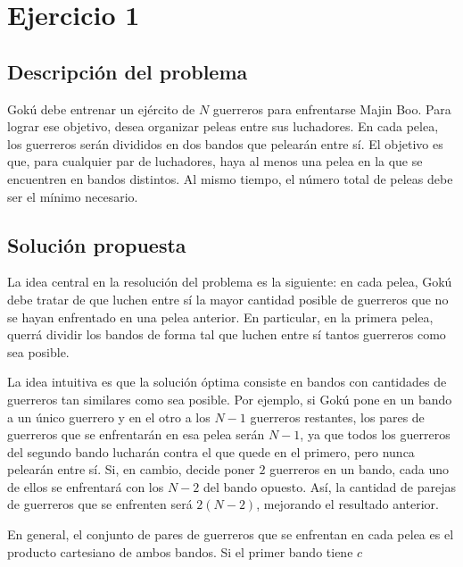 \section{Ejercicio 1}
    \subsection{Descripción del problema}
        Gokú debe entrenar un ejército de $N$ guerreros para enfrentarse Majin Boo. Para lograr ese objetivo, desea organizar peleas entre sus luchadores. En cada pelea, los guerreros serán divididos en dos bandos que pelearán entre sí. El objetivo es que, para cualquier par de luchadores, haya al menos una pelea en la que se encuentren en bandos distintos. Al mismo tiempo, el número total de peleas debe ser el mínimo necesario.


    \subsection{Solución propuesta}
        La idea central en la resolución del problema es la siguiente: en cada pelea, Gokú debe tratar de que luchen entre sí la mayor cantidad posible de guerreros que no se hayan enfrentado en una pelea anterior. En particular, en la primera pelea, querrá dividir los bandos de forma tal que luchen entre sí tantos guerreros como sea posible.

        La idea intuitiva es que la solución óptima consiste en bandos con cantidades de guerreros tan similares como sea posible. Por ejemplo, si Gokú pone en un bando a un único guerrero y en el otro a los $N - 1$ guerreros restantes, los pares de guerreros que se enfrentarán en esa pelea serán $N - 1$, ya que todos los guerreros del segundo bando lucharán contra el que quede en el primero, pero nunca pelearán entre sí. Si, en cambio, decide poner $2$ guerreros en un bando, cada uno de ellos se enfrentará con los $N - 2$ del bando opuesto. Así, la cantidad de parejas de guerreros que se enfrenten será $2 (N - 2)$, mejorando el resultado anterior.
        
        En general, el conjunto de pares de guerreros que se enfrentan en cada pelea es el producto cartesiano de ambos bandos. Si el primer bando tiene $c$

